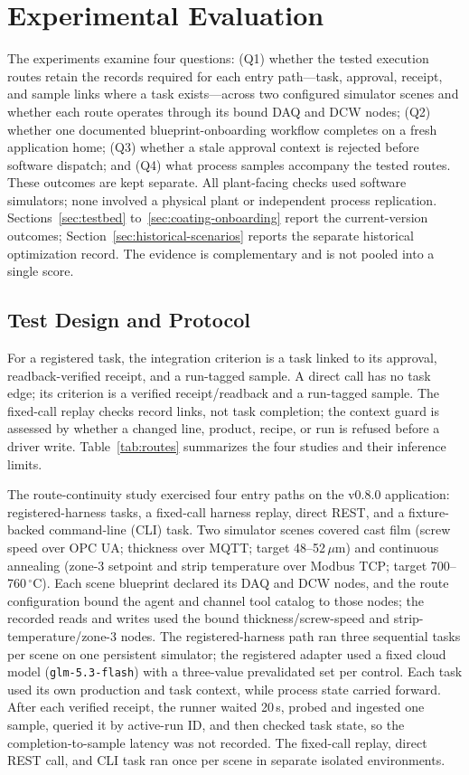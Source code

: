 \section{Experimental Evaluation}
\label{sec:eval}
The experiments examine four questions: (Q1) whether the tested execution
routes retain the records required for each entry path---task, approval,
receipt, and sample links where a task exists---across two configured simulator
scenes and whether each route operates through its bound DAQ and DCW nodes;
(Q2) whether one documented blueprint-onboarding workflow completes on a
fresh application home; (Q3) whether a stale approval context is rejected before
software dispatch; and (Q4) what process samples accompany the tested routes.
These outcomes are kept separate. All plant-facing checks used software
simulators; none involved a physical plant or independent process replication.
Sections~\ref{sec:testbed} to~\ref{sec:coating-onboarding} report the
current-version outcomes; Section~\ref{sec:historical-scenarios} reports the
separate historical optimization record. The evidence is complementary and is
not pooled into a single score.

\subsection{Test Design and Protocol}
\label{sec:eval-protocol}
For a registered task, the integration criterion is a task linked to its
approval, readback-verified receipt, and a run-tagged sample. A direct call has
no task edge; its criterion is a verified receipt/readback and a run-tagged
sample. The fixed-call replay checks record links, not task completion; the
context guard is assessed by whether a changed line, product, recipe, or run is
refused before a driver write. Table~\ref{tab:routes} summarizes the four
studies and their inference limits.

The route-continuity study exercised four entry paths on the v0.8.0
application: registered-harness tasks, a fixed-call harness replay, direct
REST, and a fixture-backed command-line (CLI) task. Two simulator scenes
covered cast film (screw speed over OPC UA; thickness over MQTT; target
48--52\,$\mu$m) and continuous annealing (zone-3 setpoint and strip
temperature over Modbus TCP; target 700--760\,$^{\circ}$C). Each scene
blueprint declared its DAQ and DCW nodes, and the route configuration bound the
agent and channel tool catalog to those nodes; the recorded reads and writes
used the bound thickness/screw-speed and strip-temperature/zone-3 nodes. The
registered-harness path ran three sequential tasks per scene on one persistent
simulator; the registered adapter used a fixed cloud model
(\texttt{glm-5.3-flash}) with a three-value prevalidated set per control. Each
task used its own production and task context, while process state carried
forward. After each verified receipt, the runner waited 20\,s, probed and
ingested one sample, queried it by active-run ID, and then checked task state,
so the completion-to-sample latency was not recorded. The fixed-call replay,
direct REST call, and CLI task ran once per scene in separate isolated
environments.

